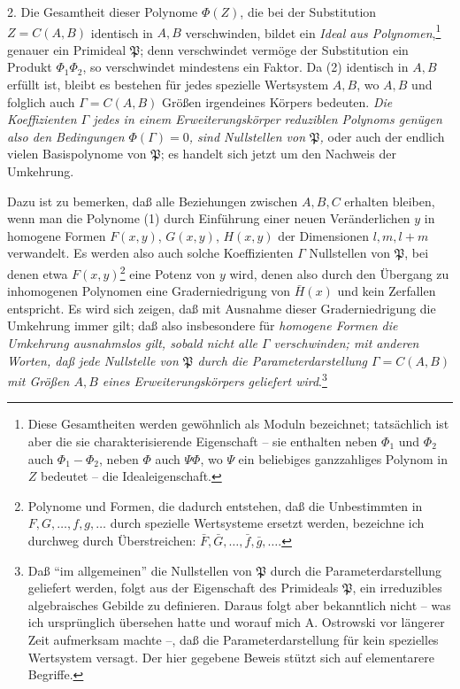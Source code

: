 2. Die Gesamtheit dieser Polynome $\Phi(Z)$, die bei der Substitution $Z=C(A,B)$ identisch in $A,B$ verschwinden, bildet ein \emph{Ideal aus Polynomen},\footnote{Diese Gesamtheiten werden gewöhnlich als Moduln bezeichnet; tatsächlich ist aber die sie charakterisierende Eigenschaft -- sie enthalten neben $\Phi_1$ und $\Phi_2$ auch $\Phi_1-\Phi_2$, neben $\Phi$ auch $\Psi\Phi$, wo $\Psi$ ein beliebiges ganzzahliges Polynom in $Z$ bedeutet -- die Idealeigenschaft.} genauer ein Primideal $\mathfrak P$; denn verschwindet vermöge der Substitution ein Produkt $\Phi_1\Phi_2$, so verschwindet mindestens ein Faktor. Da (2) identisch in $A,B$ erfüllt ist, bleibt es bestehen für jedes spezielle Wertsystem $A,B$, wo $A,B$ und folglich auch $\Gamma=C(A,B)$ Größen irgendeines Körpers bedeuten. \emph{Die Koeffizienten $\Gamma$ jedes in einem Erweiterungskörper reduziblen Polynoms genügen also den Bedingungen $\Phi(\Gamma)=0$, sind Nullstellen von $\mathfrak P$,} oder auch der endlich vielen Basispolynome von $\mathfrak P$; es handelt sich jetzt um den Nachweis der Umkehrung.

Dazu ist zu bemerken, daß alle Beziehungen zwischen $A,B,C$ erhalten bleiben, wenn man die Polynome (1) durch Einführung einer neuen Veränderlichen $y$ in homogene Formen $F(x,y)$, $G(x,y)$, $H(x,y)$ der Dimensionen $l,m,l+m$ verwandelt. Es werden also auch solche Koeffizienten $\Gamma$ Nullstellen von $\mathfrak P$, bei denen etwa $F(x,y)$\footnote{Polynome und Formen, die dadurch entstehen, daß die Unbestimmten in $F,G,\ldots,f,g,\ldots$ durch spezielle Wertsysteme ersetzt werden, bezeichne ich durchweg durch Überstreichen: $\bar F,\bar G,\ldots,\bar f,\bar g,\ldots$.} eine Potenz von $y$ wird, denen also durch den Übergang zu inhomogenen Polynomen eine Graderniedrigung von $\bar H(x)$ und kein Zerfallen entspricht. Es wird sich zeigen, daß mit Ausnahme dieser Graderniedrigung die Umkehrung immer gilt; daß also insbesondere für \emph{homogene Formen die Umkehrung ausnahmslos gilt, sobald nicht alle $\Gamma$ verschwinden; mit anderen Worten, daß jede Nullstelle von $\mathfrak P$ durch die Parameterdarstellung $\Gamma=C(A,B)$ mit Größen $A,B$ eines Erweiterungskörpers geliefert wird}.\footnote{Daß ``im allgemeinen'' die Nullstellen von $\mathfrak P$ durch die Parameterdarstellung geliefert werden, folgt aus der Eigenschaft des Primideals $\mathfrak P$, ein irreduzibles algebraisches Gebilde zu definieren. Daraus folgt aber bekanntlich nicht -- was ich ursprünglich übersehen hatte und worauf mich A. Ostrowski vor längerer Zeit aufmerksam machte --, daß die Parameterdarstellung für kein spezielles Wertsystem versagt. Der hier gegebene Beweis stützt sich auf elementarere Begriffe.}

